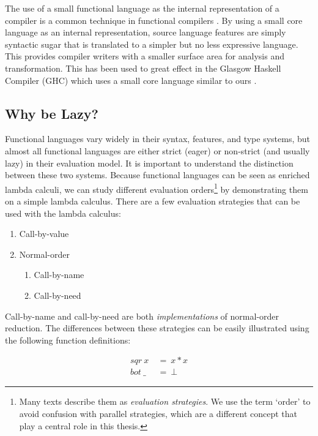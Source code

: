 The use of a small functional language as the internal representation of a
compiler is a common technique in functional compilers \citep{dutchBook,
PeytonJones:IFL, Augustsson:LazyMLCompiler, UHC}. By using a small core
language as an internal representation, source language features are simply
syntactic sugar that is translated to a simpler but no less expressive
language. This provides compiler writers with a smaller surface area for
analysis and transformation. This has been used to great effect in the Glasgow
Haskell Compiler (GHC) which uses a small core language similar to ours
\citep{peyton2002secrets, jones1998transformation}. 

\subsection{Why be Lazy?}

Functional languages vary widely in their syntax, features, and type systems,
but almost all functional languages are either strict (eager) or non-strict
(and usually lazy) in their evaluation model. It is important to understand the
distinction between these two systems. Because functional languages can be
seen as enriched lambda calculi, we can study different evaluation
orders\footnote{Many texts describe them as \emph{evaluation strategies}.  We
use the term `order' to avoid confusion with parallel strategies, which are a
different concept that play a central role in this thesis.} by demonstrating
them on a simple lambda calculus. There are a few evaluation strategies that
can be used with the lambda calculus:

    \begin{enumerate}
        \item Call-by-value
        \item Normal-order
        \begin{enumerate}
            \item Call-by-name
            \item Call-by-need
        \end{enumerate}
    \end{enumerate}

Call-by-name and call-by-need are both \emph{implementations} of normal-order
reduction.  The differences between these strategies can be easily illustrated
using the following function definitions:

\begin{align*}
    sqr \ x \  &= \  x * x \\
    bot \ \_ \ &= \  \bot
\end{align*}

